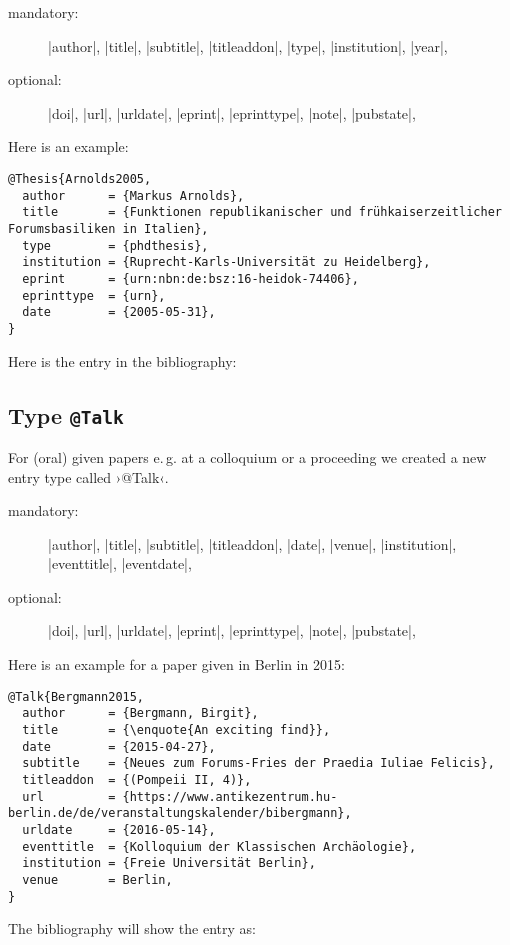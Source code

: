 \documentclass[a4paper,
10pt,
greek,
french,
spanish,
italian,
ngerman,
english
]{ltxdoc}
\begin{document}
\begin{description}
\item[mandatory:] 
|author|,
|title|, |subtitle|, |titleaddon|,
|type|, |institution|,
|year|,
\item[optional:]
|doi|, |url|, |urldate|, |eprint|, |eprinttype|, |note|, |pubstate|, 
 \end{description}
 

Here is an example:
\begin{lstlisting}[style=bibentry,label=Arnolds2005,caption={{@}Thesis\{Arnolds2005,…\} }]
@Thesis{Arnolds2005,
  author      = {Markus Arnolds},
  title       = {Funktionen republikanischer und frühkaiserzeitlicher Forumsbasiliken in Italien},
  type        = {phdthesis},
  institution = {Ruprecht-Karls-Universität zu Heidelberg},
  eprint      = {urn:nbn:de:bsz:16-heidok-74406},
  eprinttype  = {urn},
  date        = {2005-05-31},
}
\end{lstlisting}

Here is the entry in the bibliography:


 

 \subsection{Type \texttt{@Talk}}\label{talk}
For (oral) given papers e.\,g. at a colloquium or a proceeding we created a new entry type called ›@Talk‹.

\begin{description}
\item[mandatory:] 
|author|,
|title|, |subtitle|, |titleaddon|,
|date|,
|venue|,
|institution|,
|eventtitle|,
|eventdate|,
\item[optional:]
|doi|, |url|, |urldate|, |eprint|, |eprinttype|, |note|, |pubstate|, 
 \end{description}
 
Here is an example for a  paper  given in Berlin in 2015:
\begin{lstlisting}[style=bibentry,label=Bergmann2015,caption={{@}Talk\{Bergmann2015,…\} }]
@Talk{Bergmann2015,
  author      = {Bergmann, Birgit},
  title       = {\enquote{An exciting find}},
  date        = {2015-04-27},
  subtitle    = {Neues zum Forums-Fries der Praedia Iuliae Felicis},
  titleaddon  = {(Pompeii II, 4)},
  url         = {https://www.antikezentrum.hu-berlin.de/de/veranstaltungskalender/bibergmann},
  urldate     = {2016-05-14},
  eventtitle  = {Kolloquium der Klassischen Archäologie},
  institution = {Freie Universität Berlin},
  venue       = Berlin,
}
\end{lstlisting}
The bibliography will show the entry as:
\end{document}
